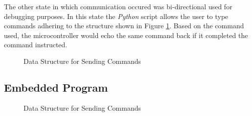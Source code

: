 The other state in which communication occured was bi-directional used for debugging purposes. In this state the \textit{Python} script allows the user to type commands adhering to the structure shown in Figure \ref{fig:uart_struct}. Based on the command used, the microcontroller would echo the same command back if it completed the command instructed.


\begin{figure}[h]
	\centering
	
	\caption{Data Structure for Sending Commands}
	\label{fig:uart_struct}
\end{figure}


\subsection{Embedded Program}
\begin{figure}[h]
	\centering
	
	\caption{Data Structure for Sending Commands}
	\label{fig:software_flow}
\end{figure}

